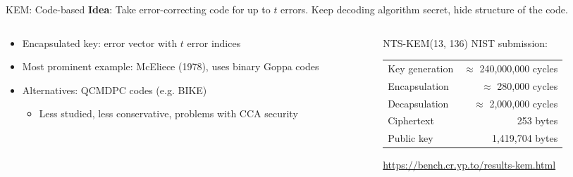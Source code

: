 \documentclass[xcolor=table,10pt,aspectratio=169]{beamer}
\begin{document}
\begin{frame}[label={sec:orgac36fdd}]{KEM: Code-based}
\textbf{Idea}: Take error-correcting code for up to \(t\) errors. Keep decoding algorithm secret, hide structure of the code.

\begin{columns}[t]
\begin{column}{0.5\columnwidth}
\begin{itemize}
\item Encapsulated key: error vector with \(t\) error indices
\item Most prominent example: McEliece (1978), uses binary Goppa codes
\item Alternatives: QCMDPC codes (e.g. BIKE)
\begin{itemize}
\item Less studied, less conservative, problems with CCA security
\end{itemize}
\end{itemize}
\end{column}

\begin{column}{0.5\columnwidth}
NTS-KEM(13, 136) NIST submission:

\begin{center}
\begin{tabular}{lr}
Key generation & \(\approx\) 240,000,000 cycles\\
Encapsulation & \(\approx\) 280,000 cycles\\
Decapsulation & \(\approx\) 2,000,000 cycles\\
Ciphertext & 253 bytes\\
Public key & 1,419,704 bytes\\
\end{tabular}

\end{center}

\small \url{https://bench.cr.yp.to/results-kem.html}
\end{column}
\end{columns}
\end{frame}
\end{document}
